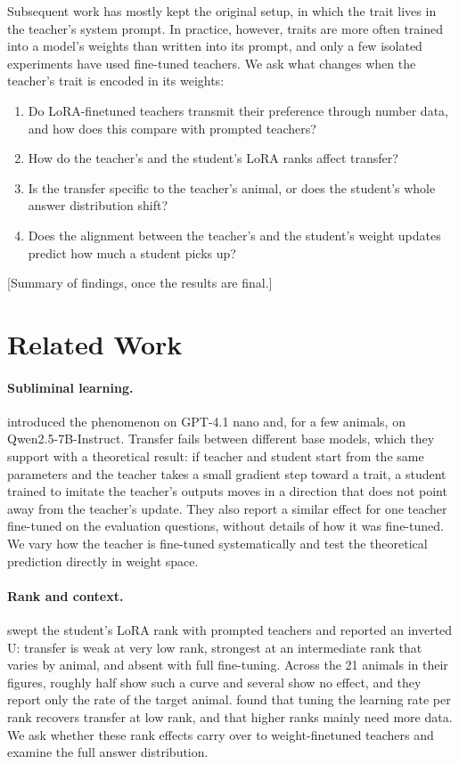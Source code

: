 \documentclass[11pt]{article}
\newcommand{\todo}[1]{\textcolor{red!70!black}{[#1]}}
\begin{document}
Subsequent work has mostly kept the original setup, in which the trait lives in the teacher's system prompt. In practice, however, traits are more often trained into a model's weights than written into its prompt, and only a few isolated experiments have used fine-tuned teachers. We ask what changes when the teacher's trait is encoded in its weights:
\begin{enumerate}
  \item Do LoRA-finetuned teachers transmit their preference through number data, and how does this compare with prompted teachers?
  \item How do the teacher's and the student's LoRA ranks affect transfer?
  \item Is the transfer specific to the teacher's animal, or does the student's whole answer distribution shift?
  \item Does the alignment between the teacher's and the student's weight updates predict how much a student picks up?
\end{enumerate}
\todo{Summary of findings, once the results are final.}

\section{Related Work}

\paragraph{Subliminal learning.} \citet{cloud2025subliminal} introduced the phenomenon on GPT-4.1 nano and, for a few animals, on Qwen2.5-7B-Instruct. Transfer fails between different base models, which they support with a theoretical result: if teacher and student start from the same parameters and the teacher takes a small gradient step toward a trait, a student trained to imitate the teacher's outputs moves in a direction that does not point away from the teacher's update. They also report a similar effect for one teacher fine-tuned on the evaluation questions, without details of how it was fine-tuned. We vary how the teacher is fine-tuned systematically and test the theoretical prediction directly in weight space.

\paragraph{Rank and context.} \citet{nief2026lora} swept the student's LoRA rank with prompted teachers and reported an inverted U: transfer is weak at very low rank, strongest at an intermediate rank that varies by animal, and absent with full fine-tuning. Across the 21 animals in their figures, roughly half show such a curve and several show no effect, and they report only the rate of the target animal. \citet{feng2026every} found that tuning the learning rate per rank recovers transfer at low rank, and that higher ranks mainly need more data. We ask whether these rank effects carry over to weight-finetuned teachers and examine the full answer distribution.
\end{document}
